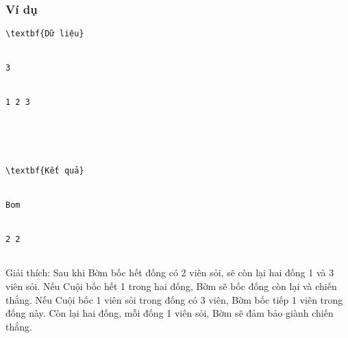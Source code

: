 \subsubsection{   Ví dụ  }
\begin{verbatim}
\textbf{Dữ liệu}


3


1 2 3 





\textbf{Kết quả}


Bom


2 2


\end{verbatim}

   Giải thích: Sau khi Bờm bốc hết đống có 2 viên sỏi, sẽ còn lại hai đống 1 và 3 viên sỏi. Nếu Cuội bốc hết 1 trong hai đống, Bờm sẽ bốc đống còn lại và chiến thắng. Nếu Cuội bốc 1 viên sỏi trong đống có 3 viên, Bờm bốc tiếp 1 viên trong đống này. Còn lại hai đống, mỗi đống 1 viên sỏi, Bờm sẽ đảm bảo giành chiến thắng.  

